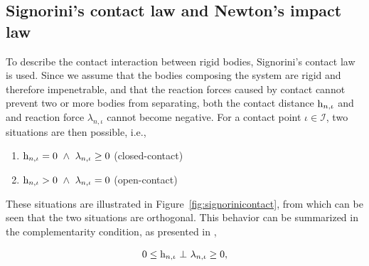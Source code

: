 \documentclass[../DC2019003Bouma.tex]{subfiles}
\begin{document}
\subsection{Signorini's contact law and Newton's impact law}\label{sec:2cont}
To describe the contact interaction between rigid bodies, Signorini's contact law is used. Since we assume that the bodies composing the system are rigid and therefore impenetrable, and that the reaction forces caused by contact cannot prevent two or more bodies from separating, both the contact distance $\mathrm{h}_{n,\iota}$ and and reaction force $\lambda_{n,\iota}$ cannot become negative. For a contact point $\iota\in\mathcal{I}$, two situations are then possible, i.e.,
\begin{enumerate}
\item $\hrm_{n,\iota}=0\ \wedge\ \lambda_{n,\iota} \geq 0$ (closed-contact)
\item $\hrm_{n,\iota}>0\ \wedge\ \lambda_{n,\iota} = 0$ (open-contact)
\end{enumerate}
These situations are illustrated in Figure~\ref{fig:signorinicontact}, from which can be seen that the two situations are orthogonal. This behavior can be summarized in the complementarity condition, as presented in \cite[Section 5.3.1]{Leine2008},

\begin{align}
0\leq \mathrm{h}_{n,\iota}\ \bot\ \lambda_{n,\iota} \geq 0,\label{eq:signorini}
\end{align}
\end{document}
